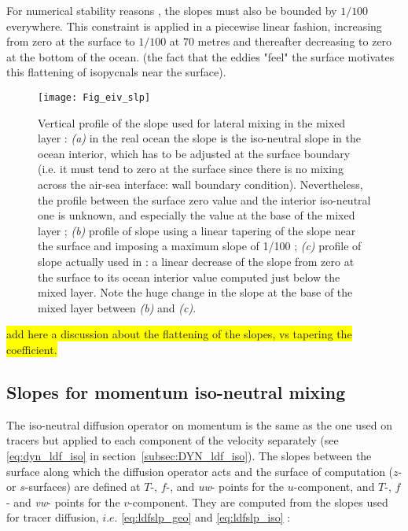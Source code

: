 \documentclass[../tex_main/NEMO_manual]{subfiles}
\begin{document}
For numerical stability reasons \citep{Cox1987, Griffies_Bk04}, the slopes must also 
be bounded by $1/100$ everywhere. This constraint is applied in a piecewise linear 
fashion, increasing from zero at the surface to $1/100$ at $70$ metres and thereafter 
decreasing to zero at the bottom of the ocean. (the fact that the eddies "feel" the 
surface motivates this flattening of isopycnals near the surface).

\begin{figure}[!ht]     \begin{center}
\texttt{[image: Fig\_eiv\_slp]}
\caption {     \protect\label{fig:eiv_slp}
Vertical profile of the slope used for lateral mixing in the mixed layer : 
\textit{(a)} in the real ocean the slope is the iso-neutral slope in the ocean interior, 
which has to be adjusted at the surface boundary (i.e. it must tend to zero at the 
surface since there is no mixing across the air-sea interface: wall boundary 
condition). Nevertheless, the profile between the surface zero value and the interior 
iso-neutral one is unknown, and especially the value at the base of the mixed layer ; 
\textit{(b)} profile of slope using a linear tapering of the slope near the surface and 
imposing a maximum slope of 1/100 ; \textit{(c)} profile of slope actually used in 
\NEMO: a linear decrease of the slope from zero at the surface to its ocean interior 
value computed just below the mixed layer. Note the huge change in the slope at the 
base of the mixed layer between  \textit{(b)}  and \textit{(c)}.}
\end{center}   \end{figure}

\colorbox{yellow}{add here a discussion about the flattening of the slopes, vs  tapering the coefficient.}

\subsection{Slopes for momentum iso-neutral mixing}

The iso-neutral diffusion operator on momentum is the same as the one used on 
tracers but applied to each component of the velocity separately (see 
\autoref{eq:dyn_ldf_iso} in section~\autoref{subsec:DYN_ldf_iso}). The slopes between the 
surface along which the diffusion operator acts and the surface of computation 
($z$- or $s$-surfaces) are defined at $T$-, $f$-, and \textit{uw}- points for the 
$u$-component, and $T$-, $f$- and \textit{vw}- points for the $v$-component. 
They are computed from the slopes used for tracer diffusion, $i.e.$ 
\autoref{eq:ldfslp_geo} and \autoref{eq:ldfslp_iso} :
\end{document}
